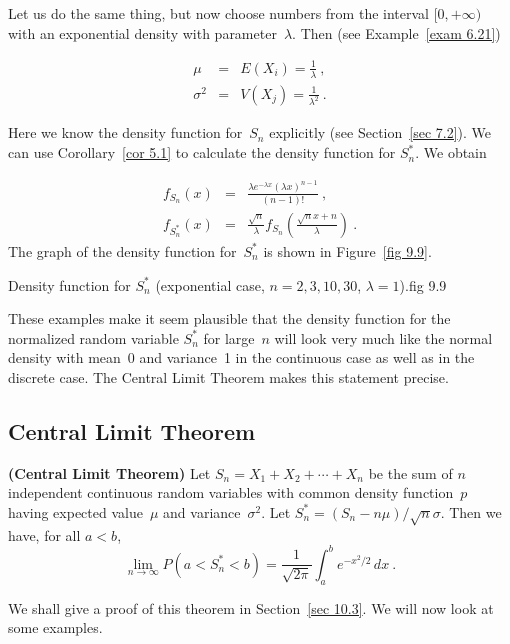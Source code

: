 \begin{example}
Let us do the same thing, but now choose numbers from the interval
$[0,+\infty)$ with an exponential density with parameter~$\lambda$.  Then (see
Example~\ref{exam 6.21})
\par
\begin{eqnarray*}
\mu & = & E(X_i)  =  \frac 1\lambda\ , \\
\sigma^2 & = & V(X_j) = \frac 1{\lambda^2}\ .
\end{eqnarray*}
\par
Here we know the density function for~$S_n$ explicitly (see
Section~\ref{sec 7.2}).  We can use Corollary~\ref{cor 5.1} to calculate the density function
for $S_n^*$.  We obtain
\par
\begin{eqnarray*}
  f_{S_n}(x) & = & \frac {\lambda e^{-\lambda x}(\lambda x)^{n - 1}}{(n - 1)!}\ , \\
f_{S_n^*}(x) & = & \frac {\sqrt n}\lambda f_{S_n} \left( \frac {\sqrt n x +
n}\lambda \right)\ .
\end{eqnarray*}
The graph of the density function for~$S_n^*$ is shown in Figure~\ref{fig
9.9}.
\end{example}

{Density function for $S^*_n$ (exponential case,
$n = 2, 3, 10, 30$, $\lambda = 1$).}{fig 9.9} 

These examples make it seem plausible that the density function for the
normalized random variable $S_n^*$ for large~$n$ will look very much like the
normal density with mean~0 and variance~1 in the continuous case as well as in
the discrete case.  The Central Limit Theorem makes this statement precise.

\subsection*{Central Limit Theorem}
\begin{theorem}\label{thm 9.4.7}{\bf (Central Limit Theorem)} 
Let $S_n = X_1 + X_2 +\cdots+ X_n$ be the sum of $n$ 
independent continuous random variables with common density function~$p$ having expected
value~$\mu$ and variance~$\sigma^2$.  Let $S_n^* = (S_n - n\mu)/\sqrt n \sigma$.  Then we
have, for all $a < b$,
$$
\lim_{n \to \infty} P(a < S_n^* < b) = \frac 1{\sqrt{2\pi}} \int_a^b
e^{-x^2/2}\, dx\ .
$$
\end{theorem}
\par
We shall give a proof of this theorem in Section~\ref{sec
10.3}.  We will now look at some examples.

